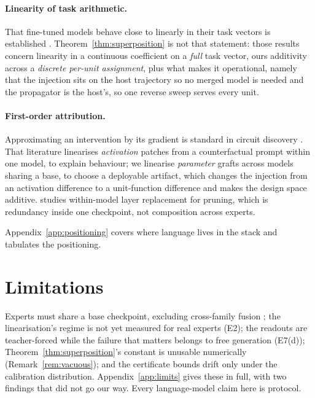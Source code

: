 \documentclass[10pt]{article}
\theoremstyle{plain}
\theoremstyle{definition}
\theoremstyle{remark}
\begin{document}
\paragraph{Linearity of task arithmetic.}
That fine-tuned models behave close to linearly in their task vectors is
established \citep{ortizjimenez2023tangent, dai2025submodule}.
Theorem~\ref{thm:superposition} is not that statement: those results concern
linearity in a continuous coefficient on a \emph{full} task vector, ours
additivity across a \emph{discrete per-unit assignment}, plus what makes it
operational, namely that the injection sits on the host trajectory so no merged
model is needed and the propagator is the host's, so one reverse sweep serves
every unit.

\paragraph{First-order attribution.}
Approximating an intervention by its gradient is standard in circuit discovery
\citep{nanda2023attribution, syed2024attribution, kramar2024atp, hanna2024eapig,
olivieri2026tft}. That literature linearises \emph{activation} patches from a
counterfactual prompt within one model, to explain behaviour; we linearise
\emph{parameter} grafts across models sharing a base, to choose a deployable
artifact, which changes the injection from an activation difference to a
unit-function difference and makes the design space additive.
\citet{garcia2026nofreeswap} studies within-model layer replacement for pruning,
which is redundancy inside one checkpoint, not composition across experts.

Appendix~\ref{app:positioning} covers where language lives in the stack and
tabulates the positioning.


\section{Limitations}
\label{sec:limitations}

Experts must share a base checkpoint, excluding cross-family fusion
\citep{chen2026hetero}; the linearisation's regime is not yet measured for real
experts (E2); the readouts are teacher-forced while the failure that matters
belongs to free generation (E7(d)); Theorem~\ref{thm:superposition}'s constant is
unusable numerically (Remark~\ref{rem:vacuous}); and the certificate bounds drift
only under the calibration distribution. Appendix~\ref{app:limits} gives these in
full, with two findings that did not go our way. Every language-model claim here
is protocol.
\end{document}
